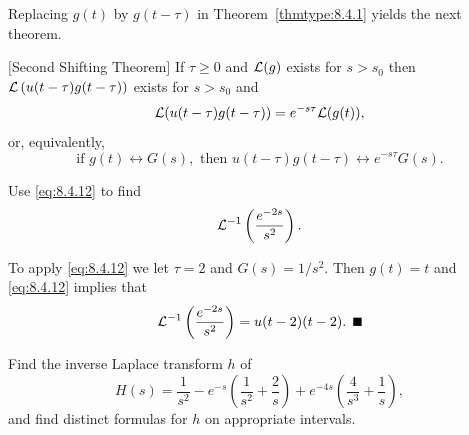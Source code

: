 
\noindent
Replacing $g(t)$ by $g(t-\tau)$ in Theorem~\ref{thmtype:8.4.1} yields the next theorem.

\begin{theorem}
  \color{blue}
  $[$Second Shifting Theorem$]$\label{thmtype:8.4.2} If $\tau\ge0$ and ${\cal L}(g)$ exists for
  $s>s_{0}$ then ${\cal L}\left(u(t-\tau)g(t-\tau)\right)$ exists for $s>s_{0}$ and
  \[
    {\cal L}(u(t-\tau)g(t-\tau))=e^{-s\tau}{\cal L}(g(t)),
  \]
  or, equivalently,
  \begin{equation}
    \label{eq:8.4.12}\mbox{if }g(t)\leftrightarrow G(s),\mbox{ then }u(t-\tau)g(t-\tau)\leftrightarrow e^{-s\tau}G(s).
  \end{equation}
\end{theorem}

\color{blue}
\color{black}

\begin{example}
  \label{example:8.4.6}\rm Use \eqref{eq:8.4.12} to find
  \[
    {\cal L}^{-1}\left(\frac{e^{-2s}}{s^{2}}\right).
  \]
\end{example}

\begin{examplesolution}
\solution To apply \eqref{eq:8.4.12} we let $\tau=2$ and $G(s)=1/s^{2}$. Then $g(t)=t$ and
\eqref{eq:8.4.12} implies that
\[
  {\cal L}^{-1}\left(\frac{e^{-2s}}{s^{2}}\right)=u(t-2)(t-2).\bbox
\]
\end{examplesolution}

\begin{example}
  \label{example:8.4.7}\rm Find the inverse Laplace transform $h$ of
  \[
    H(s)=\frac{1}{s^{2}}-e^{-s}\left(\frac{1}{s^{2}}+\frac{2}{s}\right)+ e^{-4s}\left(\frac{4}{s^{3}}+\frac{1}{s}\right),
  \]
  and find distinct formulas for $h$ on appropriate intervals.
\end{example}


